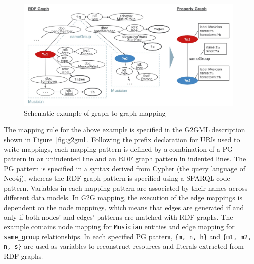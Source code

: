 \documentclass[runningheads]{llncs}
\begin{document}
\begin{figure}
\center
\includegraphics[width=1.0\textwidth]{example.jpg}
\caption{Schematic example of graph to graph mapping}
\label{fig:conversion}
\end{figure}
 
The mapping rule for the above example is specified in the G2GML description shown in Figure~\ref{fig:g2gml}. Following the prefix declaration for URIs used to write mappings, each mapping pattern is defined by a combination of a PG pattern in an unindented line and an RDF graph pattern in indented lines. The PG pattern is specified in a syntax derived from Cypher (the query language of Neo4j), whereas the RDF graph pattern is specified using a SPARQL code pattern. 
Variables in each mapping pattern are associated by their names across different data models. 
In G2G mapping, the execution of the edge mappings is dependent on the node mappings, which means that edges are generated if and only if both nodes' and edges' patterns are matched with RDF graphs. 
The example contains node mapping for \texttt{Musician} entities and edge mapping for \texttt{same\_group} relationships.
In each specified PG pattern, \texttt{\{m, n, h\}} and \texttt{\{m1, m2, n, s\}} are used as variables to reconstruct resources and literals extracted from RDF graphs. 
 
\end{document}
